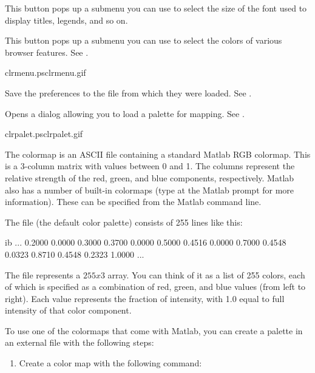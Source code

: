 \begin{description}

This button pops up a submenu you can use to select the size of the font
used to display titles, legends, and so on.


This button pops up a submenu you can use to select the colors of
various browser features.  See .

%
{clrmenu.ps}{clrmenu.gif}{}


Save the preferences to the file from which they were loaded.  See
.


Opens a dialog allowing you to load a palette for mapping.  See
. 

%
{clrpalet.ps}{clrpalet.gif}{}

The colormap is an ASCII file containing a standard Matlab RGB
colormap.  This is a 3-column matrix with values between 0 and
1. The columns represent the relative strength of the red, green,
and blue components, respectively. Matlab also has a number of built-in
colormaps (type  at the Matlab prompt for more
information). These can be specified from the Matlab command line.

The  file (the default color palette) consists of
255 lines like this:

\begin{vcode}{ib}
...
0.2000 0.0000 0.3000
0.3700 0.0000 0.5000
0.4516 0.0000 0.7000
0.4548 0.0323 0.8710
0.4548 0.2323 1.0000
...
\end{vcode}

The file represents a $255x3$ array.  You can think of it as a list of
255 colors, each of which is specified as a combination of red, green,
and blue values (from left to right).  Each value represents the
fraction of intensity, with 1.0 equal to full intensity of that color
component. 

To use one of the colormaps that come with Matlab, you can create a
palette in an external file with the following steps:

\begin{enumerate}
\item Create a color map with the following command:


\end{enumerate}
\end{description}
